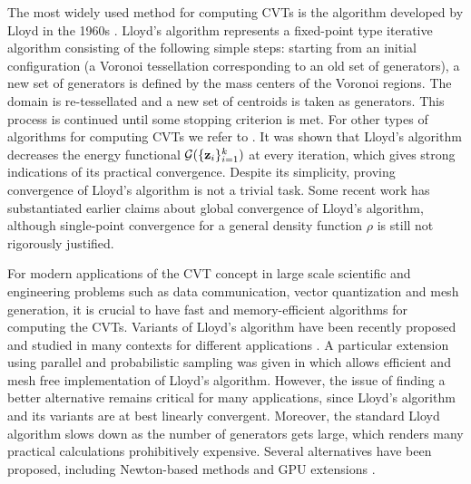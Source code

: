 \documentclass{siamltex}
\begin{document}
The most widely used method for computing CVTs is the algorithm developed by Lloyd in the 1960s \cite{Lloyd}. Lloyd's algorithm represents a fixed-point type iterative algorithm consisting of the following simple steps: starting from an initial configuration (a Voronoi tessellation corresponding to an old set of generators), a new set of generators is defined by the mass centers of the Voronoi regions. The domain is re-tessellated and a new set of centroids is taken as generators. This process is continued until some stopping criterion is met. For other types of algorithms for computing CVTs we refer to \cite{au90,dwyer,for87,DGJ10}. It was shown that Lloyd's algorithm decreases the energy functional ${\cg}(\bzin)$ at every iteration, which gives strong indications of its practical convergence. Despite its simplicity, proving convergence of Lloyd's algorithm is not a trivial task. Some recent work \cite{DEJ, EJR} has substantiated  earlier claims about global convergence of Lloyd's algorithm, although single-point convergence for a general density function $\rho$ is still not rigorously  justified.

For modern applications of the CVT concept in large scale scientific and engineering problems such as data communication, vector quantization and mesh generation, it is crucial to have fast and memory-efficient algorithms for computing the CVTs. Variants of Lloyd's algorithm have been recently proposed and studied in many contexts for different applications \cite{DGJ02,Gray98,LBG,Gray86}. A particular extension using parallel and probabilistic sampling was given in \cite{JDG02} which allows efficient and mesh free implementation of Lloyd's algorithm. However, the issue of finding a better alternative remains critical for many applications, since Lloyd's algorithm and its variants are at best linearly convergent. Moreover, the standard Lloyd algorithm slows down as the number of generators gets large, which renders many practical calculations prohibitively expensive. Several alternatives have been proposed, including Newton-based methods \cite{DE06, Levy10} and GPU extensions \cite{Levy10_1, LNCS08}.
\end{document}
